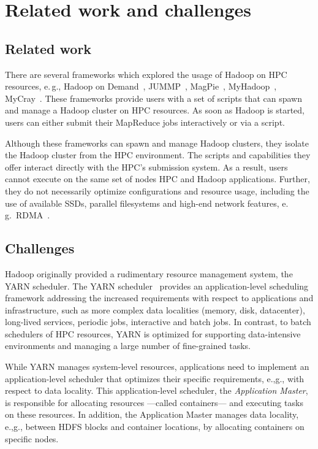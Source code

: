 \section{Related work and challenges}
\label{sec:hpc_hadoop_rel}
\subsection{Related work}
There are several frameworks which explored the usage of Hadoop on HPC resources, e.\,g., Hadoop on Demand~\cite{hod}, JUMMP~\cite{moody2013jummp}, MagPie~\cite{chu2015magpie}, MyHadoop~\cite{krishnan2011myhadoop}, MyCray~\cite{mycray}.
These frameworks provide users with a set of scripts that can spawn and manage a Hadoop cluster on HPC resources.
As soon as Hadoop is started, users can either submit their MapReduce jobs interactively or via a script.

Although these frameworks can spawn and manage Hadoop clusters, they isolate the Hadoop cluster from the HPC environment.
The scripts and capabilities they offer interact directly with the HPC's submission system.
As a result, users cannot execute on the same set of nodes HPC and Hadoop applications.
Further, they do not necessarily optimize configurations and resource usage, including the use of available SSDs, parallel filesystems and high-end network features, e.\,g.\ RDMA~\cite{rahman2014homr}.

\subsection{Challenges}
Hadoop originally provided a rudimentary resource management system, the YARN scheduler.
The YARN scheduler~\cite{vavilapalli2013apache} provides an application-level scheduling framework addressing the increased requirements with respect to applications and infrastructure, such as more complex data localities (memory, disk, datacenter), long-lived services, periodic jobs, interactive and batch jobs.
In contrast, to batch schedulers of HPC resources, YARN is optimized for supporting data-intensive environments and managing a large number of fine-grained tasks.

While YARN manages system-level resources, applications need to implement an application-level scheduler that optimizes their specific requirements, e.,g., with respect to data locality.
This application-level scheduler, the \textit{Application Master}, is responsible for allocating resources ---called containers---  and executing tasks on these resources.
In addition, the Application Master manages data locality, e.,g., between HDFS blocks and container locations, by allocating containers on specific nodes.

